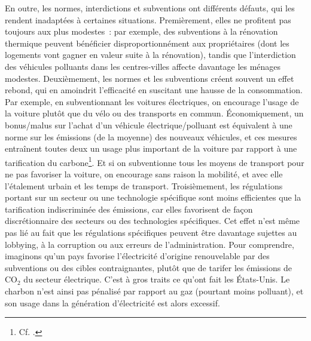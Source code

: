 \documentclass[a5paper,french,openany]{memoir}
\begin{document}
En outre, les normes, interdictions et subventions ont différents défauts, qui les rendent inadaptées à certaines situations. Premièrement, elles ne profitent pas toujours aux plus modestes~: par exemple, des subventions à la rénovation thermique peuvent bénéficier disproportionnément aux propriétaires (dont les logements vont gagner en valeur suite à la rénovation), tandis que l'interdiction des véhicules polluants dans les centres-villes affecte davantage les ménages modestes. Deuxièmement, les normes et les subventions créent souvent un effet rebond, qui en amoindrit l'efficacité en suscitant une hausse de la consommation. Par exemple, en subventionnant les voitures électriques, on encourage l'usage de la voiture plutôt que du vélo ou des transports en commun. 
Économiquement, un bonus/malus sur l'achat d'un véhicule électrique/polluant est équivalent à une norme sur les émissions (de la moyenne) des nouveaux véhicules, et ces mesures entraînent toutes deux un usage plus important de la voiture par rapport à une tarification du carbone\footnote{Cf. \cite{fullerton_suggested_2003}.}. Et si on subventionne tous les moyens de transport pour ne pas favoriser la voiture, on encourage sans raison la mobilité, et avec elle l'étalement urbain et les temps de transport. %
Troisièmement, les régulations portant sur un secteur ou une technologie spécifique sont moins efficientes que la tarification indiscriminée des émissions, car elles favorisent de façon discrétionnaire des secteurs ou des technologies spécifiques. Cet effet n'est même pas lié au fait que les régulations spécifiques peuvent être davantage sujettes au lobbying, à la corruption ou aux erreurs de l'administration. 
Pour comprendre, imaginons qu'un pays favorise l'électricité d'origine renouvelable par des subventions ou des cibles contraignantes, plutôt que de tarifer les émissions de CO$_\text{2}$ du secteur électrique. C'est à gros traits ce qu'ont fait les États-Unis. Le charbon n'est ainsi pas pénalisé par rapport au gaz (pourtant moins polluant), et son usage dans la génération d'électricité est alors excessif. %
\end{document}
